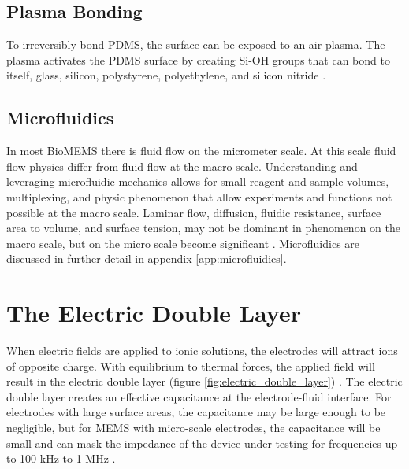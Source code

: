  
 \subsection*{Plasma Bonding}
 
 \par To irreversibly bond PDMS, the surface can be exposed to an air plasma. The plasma activates the PDMS surface by creating Si-OH groups that can bond to itself, glass, silicon, polystyrene, polyethylene, and silicon nitride \cite{mcdonald_polydimethylsiloxane_2002-1}.


 

 
 
 
 \subsection{Microfluidics}
 
\par In most BioMEMS there is fluid flow on the micrometer scale. At this scale fluid flow physics differ from fluid flow at the macro scale. Understanding and leveraging microfluidic mechanics allows for small reagent and sample volumes, multiplexing, and physic phenomenon that allow experiments and functions not possible at the macro scale. Laminar flow, diffusion, fluidic resistance, surface area to volume, and surface tension, may not be dominant in phenomenon on the macro scale, but on the micro scale become significant \cite{david_j._beebe_physics_2002}. Microfluidics are discussed in further detail in appendix \ref{app:microfluidics}.


\section{The Electric Double Layer}
\label{sec:the_electric_double_layer}

\par When electric fields are applied to ionic solutions, the electrodes will attract ions of opposite charge. With equilibrium to thermal forces, the applied field will result in the electric double layer (figure \ref{fig:electric_double_layer}) \cite{ishai_electrode_2013}. The electric double layer creates an effective capacitance at the electrode-fluid interface. For electrodes with large surface areas, the capacitance may be large enough to be negligible, but for MEMS with micro-scale electrodes, the capacitance will be small and can mask the impedance of the device under testing for frequencies up to 100 kHz to 1 MHz \cite{bordi_reduction_2001}. 

